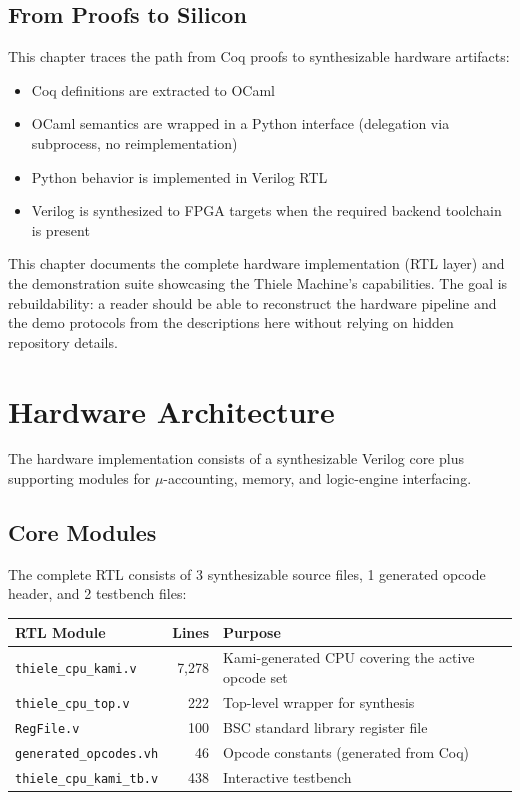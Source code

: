 \subsection{From Proofs to Silicon}

This chapter traces the path from Coq proofs to synthesizable hardware artifacts:
\begin{itemize}
    \item Coq definitions are extracted to OCaml
    \item OCaml semantics are wrapped in a Python interface (delegation via subprocess, no reimplementation)
    \item Python behavior is implemented in Verilog RTL
    \item Verilog is synthesized to FPGA targets when the required backend toolchain is present
\end{itemize}

This chapter documents the complete hardware implementation (RTL layer) and the demonstration suite showcasing the Thiele Machine's capabilities. The goal is rebuildability: a reader should be able to reconstruct the hardware pipeline and the demo protocols from the descriptions here without relying on hidden repository details.

\section{Hardware Architecture}


The hardware implementation consists of a synthesizable Verilog core plus supporting modules for $\mu$-accounting, memory, and logic-engine interfacing.

\subsection{Core Modules}

The complete RTL consists of 3 synthesizable source files, 1 generated opcode header, and 2 testbench files:

\begin{center}
{\footnotesize
\begin{tabular}{|l|r|l|}
\hline
\textbf{RTL Module} & \textbf{Lines} & \textbf{Purpose} \\
\hline
\texttt{thiele\_cpu\_kami.v} & 7,278 & Kami-generated CPU covering the active opcode set \\
\texttt{thiele\_cpu\_top.v} & 222 & Top-level wrapper for synthesis \\
\texttt{RegFile.v} & 100 & BSC standard library register file \\
\texttt{generated\_opcodes.vh} & 46 & Opcode constants (generated from Coq) \\
\texttt{thiele\_cpu\_kami\_tb.v} & 438 & Interactive testbench \\
\hline
\end{tabular}}
\end{center}

